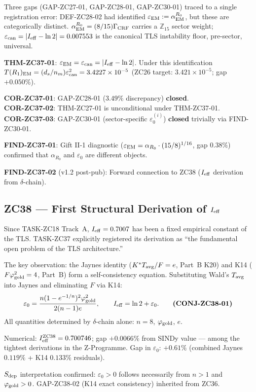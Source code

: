 \documentclass[11pt, a4paper]{article}
\newcommand{\epscan}{\varepsilon_{\rm can}}
\newcommand{\epsEM}{\varepsilon_{\rm EM}}
\newcommand{\phig}{\varphi_{\rm gold}}
\newcommand{\Tavg}{T_{\rm avg}}
\newcommand{\Kstar}{K^*}
\begin{document}
\begin{zcbox}[title={ZC37-v1.2: THM-ZC37-01 --- $\epsEM = \epscan$; Three Gap Closures}]
\sloppy
Three gaps (GAP-ZC27-01, GAP-ZC28-01, GAP-ZC30-01) traced to a single
registration error: DEF-ZC28-02 had identified $\epsEM :=
\alpha_{\rm EM}^{R_0}$, but these are categorically distinct.
$\alpha_{\rm EM}^{R_0} = (8/15)\Gamma_{\rm CRF}$ carries a
$\mathbb{Z}_{15}$ sector weight; $\epscan = |I_{\rm eff} - \ln 2|
= 0.007553$ is the canonical TLS instability floor, pre-sector,
universal.

\textbf{THM-ZC37-01}: $\epsEM = \epscan = |I_{\rm eff} - \ln 2|$. Under
this identification $T(R_1)_{\rm EM} = (d_s/n_m)\epscan^2 =
3.4227\times 10^{-5}$ (ZC26 target: $3.421\times 10^{-5}$; gap
$+0.050\%$).

\textbf{COR-ZC37-01}: GAP-ZC28-01 ($3.49\%$ discrepancy) \textbf{closed}.\\
\textbf{COR-ZC37-02}: THM-ZC27-01 is unconditional under THM-ZC37-01.\\
\textbf{COR-ZC37-03}: GAP-ZC30-01 (sector-specific $\varepsilon_0^{(i)}$)
\textbf{closed} trivially via FIND-ZC30-01.

\textbf{FIND-ZC37-01}: Gift II-1 diagnostic ($\epsEM =
\alpha_{R_0}\cdot(15/8)^{1/16}$, gap $0.38\%$) confirmed that
$\alpha_{R_0}$ and $\varepsilon_0$ are different objects.

\textbf{FIND-ZC37-02} (v1.2 post-pub): Forward connection to ZC38
($I_{\rm eff}$ derivation from $\delta$-chain).
\end{zcbox}

\subsection{ZC38 --- First Structural Derivation of $I_{\rm eff}$}

\begin{zcbox}[title={ZC38: CONJ-ZC38-01 --- $I_{\rm eff}$ from $\delta$-Chain; Gap $+0.0066\%$}]
\sloppy
Since TASK-ZC18 Track~A, $I_{\rm eff} = 0.7007$ has been a fixed
empirical constant of the TLS. TASK-ZC37 explicitly registered its
derivation as ``the fundamental open problem of the TLS architecture.''

The key observation: the Jaynes identity ($\Kstar\Tavg/F = e$, Part~B K20)
and K14 ($F\phig^2 = 4$, Part~B) form a self-consistency equation.
Substituting Wald's $\Tavg$ into Jaynes and eliminating $F$ via K14:
\[
  \varepsilon_0 = \frac{n(1-e^{-1/n})^2\phig^2}{2(n-1)e},
  \qquad I_{\rm eff} = \ln 2 + \varepsilon_0.
  \qquad \textbf{(CONJ-ZC38-01)}
\]
All quantities determined by $\delta$-chain alone: $n=8$, $\phig$, $e$.

Numerical: $I_{\rm eff}^{\rm ZC38} = 0.700746$; gap $+0.0066\%$ from
SINDy value --- among the tightest derivations in the Z-Programme.
Gap in $\varepsilon_0$: $+0.61\%$ (combined Jaynes $0.119\%$ + K14
$0.133\%$ residuals).

$S_{\rm dep}$ interpretation confirmed: $\varepsilon_0 > 0$ follows
necessarily from $n > 1$ and $\phig > 0$.
GAP-ZC38-02 (K14 exact consistency) inherited from ZC36.
\end{zcbox}
\end{document}
